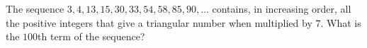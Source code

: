 The sequence $3,4,13,15,30,33,54,58,85,90,\dots$ contains, in increasing order, all the positive integers that give a triangular number when multiplied by $7$. What is the $100$th term of the sequence?
